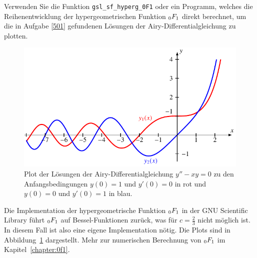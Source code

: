 Verwenden Sie die Funktion \verb+gsl_sf_hyperg_0F1+ oder ein Programm,
welches die Reihenentwicklung der hypergeometrischen Funktion
$\mathstrut_0F_1$ direkt berechnet, um die
in Aufgabe \ref{501} gefundenen Lösungen der Airy-Differentialgleichung
zu plotten.
%

\begin{figure}
\centering
\includegraphics{chapters/050-differential/uebungsaufgaben/airy.pdf}
\caption{Plot der Lösungen der Airy-Differentialgleichung $y''-xy=0$
zu den Anfangsbedingungen $y(0)=1$ und $y'(0)=0$ in {\color{red}rot}
und $y(0)=0$ und $y'(0)=1$ in {\color{blue}blau}.
\label{buch:differentialgleichunge:uebung:503:plot}}
\end{figure}
\begin{loesung}
Die Implementation der hypergeometrische Funktion $\mathstrut_0F_1$ in der
GNU Scientific Library führt $\mathstrut_0F_1$ auf Bessel-Funktionen
%
%
zurück, was für $c=\frac23$ nicht möglich ist. 
In diesem Fall ist also eine eigene Implementation nötig.
Die Plots sind in Abbildung~\ref{buch:differentialgleichunge:uebung:503:plot}
dargestellt.
Mehr zur numerischen Berechnung von $\mathstrut_0F_1$ im
Kapitel~\ref{chapter:0f1}.
\end{loesung}
